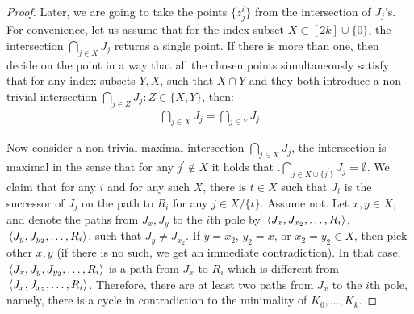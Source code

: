 \begin{proof}
Later, we are going to take the points $\{z_{j}^{i}\}$ from the intersection of $J_{j}$'s. For convenience, let us assume that for the index subset $X \subset [2k]\cup\{0\}$, the intersection $\bigcap_{j \in X}J_{j}$ returns a single point. If there is more than one, then decide on the point in a way that all the chosen points simultaneously satisfy that for any index subsets $Y, X$, such that $X \cap Y$ and they both introduce a non-trivial intersection $\bigcap_{j \in Z} J_{j} : Z\in \{X,Y\}$, then:
    \begin{equation*}
      \begin{split}
        \bigcap_{j \in X} J_{j} = \bigcap_{j \in Y } J_{j} 
      \end{split}
    \end{equation*}

    Now consider a non-trivial maximal intersection $\bigcap_{j \in X} J_{j}$, the intersection is maximal in the sense that for any $j^{\prime} \notin X$ it holds that .$\bigcap_{j \in X\cup \{j^{\prime} \}} J_{j} = \emptyset$. We claim that for any $i$ and for any such $X$, there is $t \in X$ such that $J_{t}$ is the successor of $J_{j}$ on the path to $R_{i}$ for any $j \in X/\{t\}$. Assume not. Let $x, y \in X$, and denote the paths from $J_{x}, J_{y}$ to the $i$th pole by $\expval*{J_{x}, J_{x_2}, \ldots, R_{i}}$, $\expval*{J_{y}, J_{y_2}, \ldots, R_{i}}$, such that $J_{y} \neq J_{x_{2}}$. If $y = x_{2}$, $y_{2} = x$, or $x_{2} = y_{2} \in X$, then pick other $x, y$ (if there is no such, we get an immediate contradiction). In that case, $\expval*{J_{x}, J_{y}, J_{y_{2}}, \ldots, R_{i}}$ is a path from $J_{x}$ to $R_{i}$ which is different from $\expval*{J_{x}, J_{x_{2}}, \ldots, R_{i}}$. Therefore, there are at least two paths from $J_{x}$ to the $i$th pole, namely, there is a cycle in contradiction to the minimality of $K_{0}, \ldots, K_{k}$.



\end{proof}
